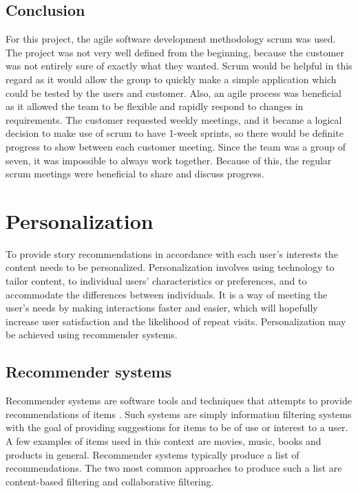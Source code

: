 \subsection{Conclusion}
For this project, the agile software development methodology scrum was used. The project was not very well defined from the beginning, because the customer was not entirely sure of exactly what they wanted. Scrum would be helpful in this regard as it would allow the group to quickly make a simple application which could be tested by the users and customer. Also, an agile process was beneficial as it allowed the team to be flexible and rapidly respond to changes in requirements. The customer requested weekly meetings, and it became a logical decision to make use of scrum to have 1-week  sprints, so there would be definite progress to show between each customer meeting. Since the team was a group of seven, it was impossible to always work together. Because of this, the regular scrum meetings were beneficial to share and discuss progress.


\section{Personalization}
\label{sec:personalization_algorithms}

To provide story recommendations in accordance with each user's interests the content needs to be personalized. Personalization involves using technology to tailor content, to individual users' characteristics or preferences, and to accommodate the differences between individuals. It is a way of meeting the user's needs by making interactions faster and easier, which will hopefully increase user satisfaction and the likelihood of repeat visits. Personalization may be achieved using recommender systems.

\subsection{Recommender systems}

Recommender systems are software tools and techniques that attempts to provide recommendations of items \cite{HM4}. Such systems are simply information filtering systems with the goal of providing suggestions for items to be of use or interest to a user. A few examples of items used in this context are movies, music, books and products in general. Recommender systems typically produce a list of recommendations.  The two most common approaches to produce such a list are content-based filtering and collaborative filtering.


